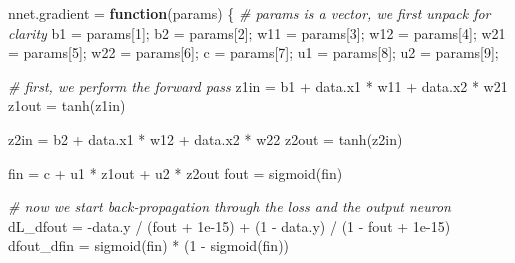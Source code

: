 \documentclass[
  a4paper,
]{article}
\newenvironment{Shaded}{\begin{snugshade}}{\end{snugshade}}
\newcommand{\CommentTok}[1]{\textcolor[rgb]{0.56,0.35,0.01}{\textit{#1}}}
\newcommand{\ControlFlowTok}[1]{\textcolor[rgb]{0.13,0.29,0.53}{\textbf{#1}}}
\newcommand{\DecValTok}[1]{\textcolor[rgb]{0.00,0.00,0.81}{#1}}
\newcommand{\FloatTok}[1]{\textcolor[rgb]{0.00,0.00,0.81}{#1}}
\newcommand{\FunctionTok}[1]{\textcolor[rgb]{0.00,0.00,0.00}{#1}}
\newcommand{\NormalTok}[1]{#1}
\newcommand{\OtherTok}[1]{\textcolor[rgb]{0.56,0.35,0.01}{#1}}
\newcommand{\SpecialCharTok}[1]{\textcolor[rgb]{0.00,0.00,0.00}{#1}}
\begin{document}
\begin{Shaded}
\begin{Highlighting}[]
\NormalTok{nnet.gradient }\OtherTok{=} \ControlFlowTok{function}\NormalTok{(params) \{}
  \CommentTok{\# params is a vector, we first unpack for clarity}
\NormalTok{  b1 }\OtherTok{=}\NormalTok{ params[}\DecValTok{1}\NormalTok{]; b2 }\OtherTok{=}\NormalTok{ params[}\DecValTok{2}\NormalTok{];}
\NormalTok{  w11 }\OtherTok{=}\NormalTok{ params[}\DecValTok{3}\NormalTok{]; w12 }\OtherTok{=}\NormalTok{ params[}\DecValTok{4}\NormalTok{];}
\NormalTok{  w21 }\OtherTok{=}\NormalTok{ params[}\DecValTok{5}\NormalTok{]; w22 }\OtherTok{=}\NormalTok{ params[}\DecValTok{6}\NormalTok{];}
\NormalTok{  c }\OtherTok{=}\NormalTok{ params[}\DecValTok{7}\NormalTok{]; u1 }\OtherTok{=}\NormalTok{ params[}\DecValTok{8}\NormalTok{]; u2 }\OtherTok{=}\NormalTok{ params[}\DecValTok{9}\NormalTok{];}
  
  \CommentTok{\# first, we perform the forward pass}
\NormalTok{  z1in }\OtherTok{=}\NormalTok{ b1 }\SpecialCharTok{+}\NormalTok{ data.x1 }\SpecialCharTok{*}\NormalTok{ w11 }\SpecialCharTok{+}\NormalTok{ data.x2 }\SpecialCharTok{*}\NormalTok{ w21}
\NormalTok{  z1out }\OtherTok{=} \FunctionTok{tanh}\NormalTok{(z1in)}
  
\NormalTok{  z2in }\OtherTok{=}\NormalTok{ b2 }\SpecialCharTok{+}\NormalTok{ data.x1 }\SpecialCharTok{*}\NormalTok{ w12 }\SpecialCharTok{+}\NormalTok{ data.x2 }\SpecialCharTok{*}\NormalTok{ w22}
\NormalTok{  z2out }\OtherTok{=} \FunctionTok{tanh}\NormalTok{(z2in)}
  
\NormalTok{  fin }\OtherTok{=}\NormalTok{ c }\SpecialCharTok{+}\NormalTok{ u1 }\SpecialCharTok{*}\NormalTok{ z1out }\SpecialCharTok{+}\NormalTok{ u2 }\SpecialCharTok{*}\NormalTok{ z2out}
\NormalTok{  fout }\OtherTok{=} \FunctionTok{sigmoid}\NormalTok{(fin)}
  
  \CommentTok{\# now we start back{-}propagation through the loss and the output neuron}
\NormalTok{  dL\_dfout }\OtherTok{=} \SpecialCharTok{{-}}\NormalTok{data.y }\SpecialCharTok{/}\NormalTok{ (fout }\SpecialCharTok{+} \FloatTok{1e{-}15}\NormalTok{) }\SpecialCharTok{+}\NormalTok{ (}\DecValTok{1} \SpecialCharTok{{-}}\NormalTok{ data.y) }\SpecialCharTok{/}\NormalTok{ (}\DecValTok{1} \SpecialCharTok{{-}}\NormalTok{ fout }\SpecialCharTok{+} \FloatTok{1e{-}15}\NormalTok{)}
\NormalTok{  dfout\_dfin }\OtherTok{=} \FunctionTok{sigmoid}\NormalTok{(fin) }\SpecialCharTok{*}\NormalTok{ (}\DecValTok{1} \SpecialCharTok{{-}} \FunctionTok{sigmoid}\NormalTok{(fin))}
  

\end{Highlighting}
\end{Shaded}
\end{document}
